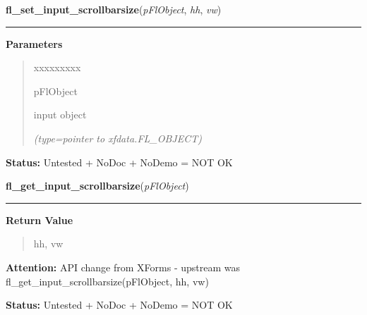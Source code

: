 \hspace{.8\funcindent}\begin{boxedminipage}{\funcwidth}

    \raggedright \textbf{fl\_set\_input\_scrollbarsize}(\textit{pFlObject}, \textit{hh}, \textit{vw})

    \vspace{-1.5ex}

    \rule{\textwidth}{0.5\fboxrule}
\setlength{\parskip}{2ex}
\setlength{\parskip}{1ex}
      \textbf{Parameters}
      \vspace{-1ex}

      \begin{quote}
        \begin{Ventry}{xxxxxxxxx}

          \item[pFlObject]

          input object

            {\it (type=pointer to xfdata.FL\_OBJECT)}

        \end{Ventry}

      \end{quote}

\textbf{Status:} Untested + NoDoc + NoDemo = NOT OK



    \end{boxedminipage}

    \label{xformslib:flinput:fl_get_input_scrollbarsize}

    \vspace{0.5ex}

\hspace{.8\funcindent}\begin{boxedminipage}{\funcwidth}

    \raggedright \textbf{fl\_get\_input\_scrollbarsize}(\textit{pFlObject})

    \vspace{-1.5ex}

    \rule{\textwidth}{0.5\fboxrule}
\setlength{\parskip}{2ex}
\setlength{\parskip}{1ex}
      \textbf{Return Value}
    \vspace{-1ex}

      \begin{quote}
      hh, vw

      \end{quote}

\textbf{Attention:} API change from XForms - upstream was 
fl\_get\_input\_scrollbarsize(pFlObject, hh, vw)



\textbf{Status:} Untested + NoDoc + NoDemo = NOT OK



    \end{boxedminipage}

